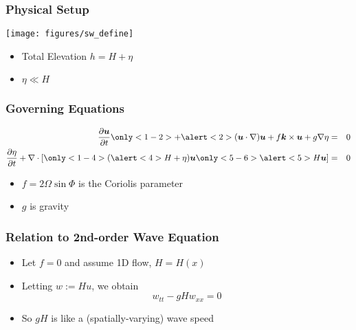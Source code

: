 \begin{frame}[t]
  \frametitle{Physical Setup}
  \begin{center}
  \texttt{[image: figures/sw\_define]}
  \end{center}
      \begin{itemize}
      \item
	{
	 Total Elevation $h=H+\eta$ 
	}
      \item
	{
	  $\eta \ll H$
	}
      \end{itemize}
\end{frame}

\begin{frame}
  \frametitle{Governing Equations}
  \begin{eqnarray}
    \nonumber
    \frac{\partial \bv{u}}{\partial t}
    \only<1-2>
    {
      + \alert<2>{(\bv{u} \cdot \nabla) \bv{u}}
    }
    + f \bv{k}\times \bv{u} + g \nabla \eta &=& 0 \\
    \nonumber
    \frac{\partial \eta}{\partial t} +
    \nabla \cdot \left[
      \only<1-4>
      {
	(\alert<4>{H + \eta}) \bv{u}
      }
      \only<5-6>
      {
	\alert<5>{H} \bv{u}
      }
      \right]  &=& 0
  \end{eqnarray}
  \begin{itemize}
    \item {$f=2\varOmega\sin\varPhi$ is the Coriolis parameter}
    \item {$g$ is gravity}
  \end{itemize}
\end{frame}


\begin{frame}%
  \frametitle{Relation to 2nd-order Wave Equation}
  \begin{itemize}
    \item{Let $f=0$ and assume 1D flow, $H=H(x)$}
    \item{
      Letting $w := Hu$, we obtain
      \begin{equation}
	\nonumber
	w_{tt} - gH w_{xx} = 0
      \end{equation}
    }
    \item{So $gH$ is like a (spatially-varying) wave speed}
  \end{itemize}
\end{frame}


